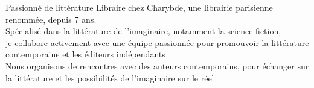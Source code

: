 

\begin{cvskills}

\cvskill
{Passionné de littérature} %
{Libraire chez Charybde, une librairie parisienne renommée, depuis 7 ans. \\
Spécialisé dans la littérature de l'imaginaire, notamment la science-fiction, \\
je collabore  activement avec une équipe passionnée pour promouvoir la littérature contemporaine et les éditeurs indépendants\\
Nous organisons de rencontres avec des auteurs contemporains, pour échanger sur la littérature et les possibilités de l'imaginaire sur le réel }

\end{cvskills}
